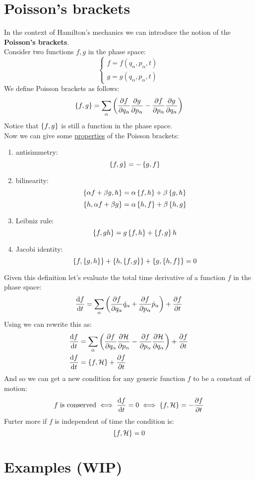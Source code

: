 \section{Poisson's brackets}
In the context of Hamilton's mechanics we can introduce the notion of the \textbf{Poisson's brackets}.\\
Consider two functions $f,g$ in the phase space:
\begin{equation}
    \begin{cases}
        f = f(q_{\alpha},p_{\alpha},t)\\
        g = g(q_{\alpha},p_{\alpha},t)
    \end{cases}
\end{equation}
We define Poisson brackets as follows:
\begin{equation}
    \left\{f,g\right\} = \displaystyle\sum_{\alpha}\left(\dfrac{\partial f}{\partial q_{\alpha}}\dfrac{\partial g}{\partial p_\alpha} - \dfrac{\partial f}{\partial p_{\alpha}}\dfrac{\partial g}{\partial q_{\alpha}}\right)
\end{equation}
Notice that $\left\{f,g\right\}$ is still a function in the phase space.\\
Now we can give some \underline{properties} of the Poisson brackets:
\begin{enumerate}
    \item antisimmetry: \[\left\{f,g\right\} = - \left\{g,f\right\}\]
    \item bilinearity:
    \[\left\{\alpha f + \beta g,h\right\} = \alpha\left\{f,h\right\}+ \beta\left\{g,h\right\}\]
    \[\left\{h,\alpha f + \beta g\right\} = \alpha\left\{h,f\right\}+ \beta\left\{h,g\right\}\]
    \item Leibniz rule: \[\left\{f,gh\right\} = g\left\{f,h\right\} + \left\{f,g\right\}h\]
    \item Jacobi identity: \[\left\{f,\left\{g,h\right\}\right\} + \left\{h,\left\{f,g\right\}\right\} + \left\{g,\left\{h,f\right\}\right\} = 0\]
\end{enumerate}
Given this definition let's evaluate the total time derivative of a function $f$ in the phase space:
\begin{equation}
    \dfrac{\mathrm{d}f }{\mathrm{d}t} = \displaystyle\sum_{\alpha}\left(\dfrac{\partial f}{\partial q_{\alpha}}\dot{q}_{\alpha} + \dfrac{\partial f}{\partial p_{\alpha}}\dot{p}_{\alpha}\right) + \dfrac{\partial f}{\partial t}
\end{equation}
Using \hamiltonref\;we can rewrite this as:
\begin{equation}
    \begin{split}
        \dfrac{\mathrm{d}f }{\mathrm{d}t} &= \displaystyle\sum_{\alpha}\left(\dfrac{\partial f}{\partial q_{\alpha}}\dfrac{\partial \mathcal{H}}{\partial p_{\alpha}} - \dfrac{\partial f}{\partial p_{\alpha}}\dfrac{\partial \mathcal{H}}{\partial q_{\alpha}}\right) + \dfrac{\partial f}{\partial t}\\
        \dfrac{\mathrm{d}f }{\mathrm{d}t} &= \left\{f,\mathcal{H}\right\} + \dfrac{\partial f}{\partial t}
    \end{split}
\end{equation}
And so we can get a new condition for any generic function $f$ to be a constant of motion:
\begin{equation}
    f\;\text{is conserved} \iff \dfrac{\mathrm{d}f }{\mathrm{d}t} = 0 \iff \left\{f,\mathcal{H}\right\} = -\dfrac{\partial f}{\partial t}
\end{equation}
Furter more if $f$ is independent of time the condition is:
\begin{equation}
    \left\{f,\mathcal{H}\right\} = 0
\end{equation}
\section{Examples (WIP)}
